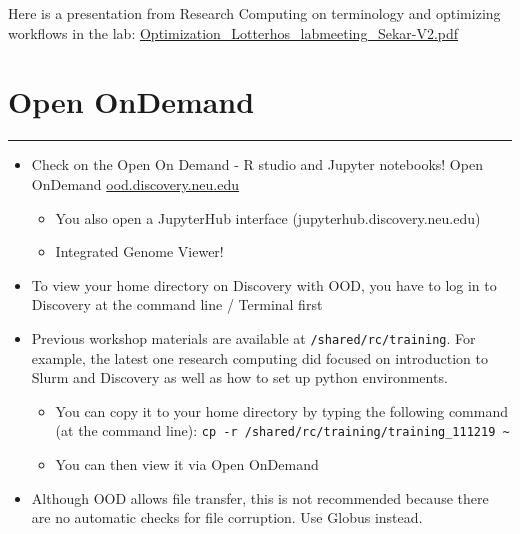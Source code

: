 \documentclass[
  letterpaper,
  DIV=11,
  numbers=noendperiod]{scrreprt}
\begin{document}
Here is a presentation from Research Computing on terminology and
optimizing workflows in the lab:
\href{https://drk-lo.github.io/lotterhoslabprotocols/img/Optimization_Lotterhos_labmeeting_Sekar-V2.pdf}{Optimization\_Lotterhos\_labmeeting\_Sekar-V2.pdf}

\hypertarget{open-ondemand}{%
\chapter{Open OnDemand}\label{open-ondemand}}

\begin{center}\rule{0.5\linewidth}{0.5pt}\end{center}

\begin{itemize}
\item
  Check on the Open On Demand - R studio and Jupyter notebooks! Open
  OnDemand
  \href{https://drk-lo.github.io/lotterhoslabprotocols/discovery_1a-OOD/ood.discovery.neu.edu}{ood.discovery.neu.edu}

  \begin{itemize}
  \item
    You also open a JupyterHub interface (jupyterhub.discovery.neu.edu)
  \item
    Integrated Genome Viewer!
  \end{itemize}
\item
  To view your home directory on Discovery with OOD, you have to log in
  to Discovery at the command line / Terminal first
\item
  Previous workshop materials are available at
  \texttt{/shared/rc/training}. For example, the latest one research
  computing did focused on introduction to Slurm and Discovery as well
  as how to set up python environments.

  \begin{itemize}
  \item
    You can copy it to your home directory by typing the following
    command (at the command line):
    \texttt{cp\ -r\ /shared/rc/training/training\_111219\ \textasciitilde{}}
  \item
    You can then view it via Open OnDemand
  \end{itemize}
\item
  Although OOD allows file transfer, this is not recommended because
  there are no automatic checks for file corruption. Use Globus instead.
\end{itemize}
\end{document}
